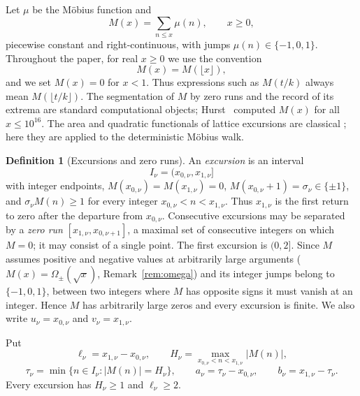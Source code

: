 \documentclass[11pt,reqno]{amsart}
\numberwithin{equation}{section}
\theoremstyle{plain}
\theoremstyle{definition}
\newtheorem{definition}[theorem]{Definition}
\theoremstyle{remark}
\begin{document}
Let $\mu$ be the M\"obius function and
\begin{equation}
\label{eq:mertens_def}
M(x)=\sum_{n\le x}\mu(n),\qquad x\ge0,
\end{equation}
piecewise constant and right-continuous, with jumps $\mu(n)\in\{-1,0,1\}$.
Throughout the paper, for real $x\ge0$ we use the convention
\begin{equation}
M(x)=M(\lfloor x\rfloor),
\end{equation}
and we set $M(x)=0$ for $x<1$. Thus expressions such as $M(t/k)$ always
mean $M(\lfloor t/k\rfloor)$. The segmentation of $M$ by zero runs and the record of its
extrema are standard computational objects; Hurst~\cite{Hurst18} computed
$M(x)$ for all $x\le10^{16}$. The area and quadratic functionals of lattice
excursions are classical
\cite{Takacs91,NguyenThe04,Richard05,Janson07,DKW15,CP17}; here they are
applied to the deterministic M\"obius walk.

\begin{definition}[Excursions and zero runs]
\label{def:excursion}
An \emph{excursion} is an interval
\begin{equation}
I_\nu=(x_{0,\nu},x_{1,\nu}]
\end{equation}
with integer endpoints, $M(x_{0,\nu})=M(x_{1,\nu})=0$,
$M(x_{0,\nu}+1)=\sigma_\nu\in\{\pm1\}$, and
$\sigma_\nu M(n)\ge1$ for every integer $x_{0,\nu}<n<x_{1,\nu}$. Thus
$x_{1,\nu}$ is the first return to zero after the departure from
$x_{0,\nu}$. Consecutive excursions may be separated by a \emph{zero run}
$[x_{1,\nu},x_{0,\nu+1}]$, a maximal set of consecutive integers on which
$M=0$; it may consist of a single point. The first excursion is $(0,2]$.
Since $M$ assumes positive and negative values at arbitrarily large
arguments ($M(x)=\Omega_\pm(\sqrt x)$, Remark~\ref{rem:omega}) and its
integer jumps belong to $\{-1,0,1\}$, between two integers where $M$ has
opposite signs it must vanish at an integer.  Hence $M$ has arbitrarily large zeros and every
excursion is finite. We also write $u_\nu=x_{0,\nu}$ and
$v_\nu=x_{1,\nu}$.

Put
\begin{equation}
\ell_\nu=x_{1,\nu}-x_{0,\nu},\qquad
H_\nu=\max_{x_{0,\nu}<n<x_{1,\nu}}|M(n)|,
\end{equation}
\begin{equation}
\tau_\nu=\min\{n\in I_\nu:|M(n)|=H_\nu\},\qquad
a_\nu=\tau_\nu-x_{0,\nu},\qquad b_\nu=x_{1,\nu}-\tau_\nu.
\end{equation}
Every excursion has $H_\nu\ge1$ and $\ell_\nu\ge2$.
\end{definition}
\end{document}
